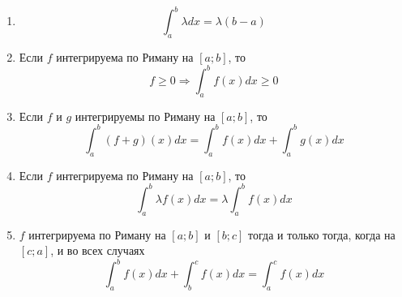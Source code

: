 \documentclass[12pt,a4paper]{article}
\begin{document}
    \begin{theorem}\ 
        \begin{multicols}{2}
            \begin{enumerate}
                \item \[\int_a^b \lambda dx = \lambda(b-a)\]
                \item Если $f$ интегрируема по Риману на $[a; b]$, то
                    \[f \geqslant 0 \Longrightarrow \int_a^b f(x)dx \geqslant 0\]
                \item Если $f$ и $g$ интегрируемы по Риману на $[a; b]$, то
                    \[\int_a^b (f+g)(x)dx = \int_a^b f(x)dx + \int_a^b g(x)dx\]
                \item Если $f$ интегрируема по Риману на $[a; b]$, то
                    \[\int_a^b \lambda f(x)dx = \lambda \int_a^b f(x)dx\]
                \item $f$ интегрируема по Риману на $[a; b]$ и $[b; c]$ тогда и только тогда, когда на $[c; a]$, и во всех случаях
                    \[\int_a^b f(x)dx + \int_b^c f(x)dx = \int_a^c f(x)dx\]
            \end{enumerate}
        \end{multicols}
    \end{theorem}
\end{document}
